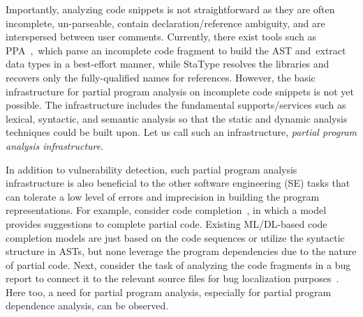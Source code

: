 

Importantly, analyzing code snippets is not straightforward as they
are often incomplete, un-parseable, contain declaration/reference
ambiguity, and are interspersed between user comments. Currently,
there exist tools such as PPA~\cite{ppa08},~which parse an incomplete
code fragment to build the AST and~ex\-tract data types in a
best-effort manner, while StaType \cite{icse18} resolves the libraries
and recovers only the fully-qualified names for references. However,
the basic infrastructure for partial program analysis on incomplete
code snippets is not yet possible. The infrastructure includes the
fundamental supports/services such as lexical, syntactic, and semantic
analysis so that the static and dynamic analysis techniques could be
built upon. Let us call such an infrastructure, {\em partial program
analysis infrastructure}.

In addition to vulnerability detection, such partial program analysis
infrastructure is also beneficial to the other software engineering
(SE) tasks that can tolerate a low level of errors and imprecision in
building the program representations. For example, consider code
completion~\cite{codefill-icse22,facebook-icse21}, in which a model
provides suggestions to complete partial code. Existing ML/DL-based
code completion models are just based on the code sequences or utilize
the syntactic structure in ASTs, but none leverage the program
dependencies due to the nature of partial code. Next, consider the
task of analyzing the code fragments in a bug report to connect it to
the relevant source files for bug localization
purposes~\cite{euler-fse19,icpc17}. Here too, a need for partial
program analysis, especially for partial program dependence analysis,
can be observed.








